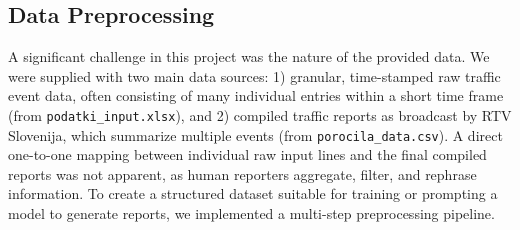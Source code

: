 \documentclass[fleqn,moreauthors,10pt]{ds_report}
\begin{document}

\subsection*{Data Preprocessing}
A significant challenge in this project was the nature of the provided data. We were supplied with two main data sources: 1) granular, time-stamped raw traffic event data, often consisting of many individual entries within a short time frame (from \texttt{podatki\_input.xlsx}), and 2) compiled traffic reports as broadcast by RTV Slovenija, which summarize multiple events (from \texttt{porocila\_data.csv}). A direct one-to-one mapping between individual raw input lines and the final compiled reports was not apparent, as human reporters aggregate, filter, and rephrase information. To create a structured dataset suitable for training or prompting a model to generate reports, we implemented a multi-step preprocessing pipeline.
\end{document}

